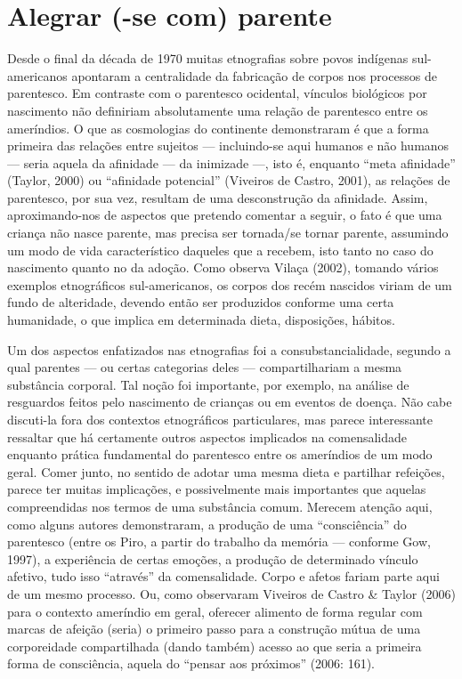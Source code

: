 \section{Alegrar (-se com) parente}

Desde o final da década de 1970 muitas etnografias sobre povos indígenas
sul-americanos apontaram a centralidade da fabricação de corpos nos
processos de parentesco. Em contraste com o parentesco ocidental,
vínculos biológicos por nascimento não definiriam absolutamente uma
relação de parentesco entre os ameríndios. O que as cosmologias do
continente demonstraram é que a forma primeira das relações entre
sujeitos --- incluindo-se aqui humanos e não humanos --- seria aquela da
afinidade --- da inimizade ---, isto é, enquanto ``meta afinidade'' (Taylor,
2000) ou ``afinidade potencial'' (Viveiros de Castro, 2001), as relações
de parentesco, por sua vez, resultam de uma desconstrução da afinidade.
Assim, aproximando-nos de aspectos que pretendo comentar a seguir, o
fato é que uma criança não nasce parente, mas precisa ser tornada/se
tornar parente, assumindo um modo de vida característico daqueles que a
recebem, isto tanto no caso do nascimento quanto no da adoção. Como
observa Vilaça (2002), tomando vários exemplos etnográficos
sul-americanos, os corpos dos recém nascidos viriam de um fundo de
alteridade, devendo então ser produzidos conforme uma certa humanidade,
o que implica em determinada dieta, disposições, hábitos.

Um dos aspectos enfatizados nas etnografias foi a consubstancialidade,
segundo a qual parentes --- ou certas categorias deles --- compartilhariam
a mesma substância corporal. Tal noção foi importante, por exemplo, na
análise de resguardos feitos pelo nascimento de crianças ou em eventos
de doença. Não cabe discuti-la fora dos contextos etnográficos
particulares, mas parece interessante ressaltar que há certamente
outros aspectos implicados na comensalidade enquanto prática
fundamental do parentesco entre os ameríndios de um modo geral. Comer
junto, no sentido de adotar uma mesma dieta e partilhar refeições,
parece ter muitas implicações, e possivelmente mais importantes que
aquelas compreendidas nos termos de uma substância comum. Merecem
atenção aqui, como alguns autores demonstraram, a produção de uma
``consciência'' do parentesco (entre os Piro, a partir do trabalho da
memória --- conforme Gow, 1997), a experiência de certas emoções, a
produção de determinado vínculo afetivo, tudo isso ``através'' da
comensalidade. Corpo e afetos fariam parte aqui de um mesmo processo.
Ou, como observaram Viveiros de Castro \& Taylor (2006) para o contexto
ameríndio em geral, oferecer alimento de forma regular com marcas de
afeição (seria) o primeiro passo para a construção mútua de uma
corporeidade compartilhada (dando também) acesso ao que seria a
primeira forma de consciência, aquela do ``pensar aos próximos'' (2006:
161).

